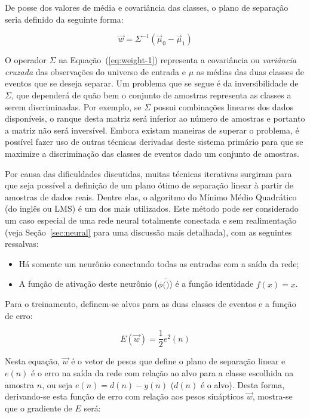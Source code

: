 De posse dos valores de média e covariância das classes, o plano de separação
seria definido da seguinte forma:

\begin{equation}
\overrightarrow{w} = \Sigma^{-1}(\overrightarrow{\mu}_0 -
\overrightarrow{\mu}_1) 
\label{eq:weight-1}
\end{equation}

O operador $\Sigma$ na Equação~(\ref{eq:weight-1}) representa a covariância ou
\textit{variância cruzada} das observações do universo de entrada e $\mu$ as
médias das duas classes de eventos que se deseja separar. Um problema que se
segue é da inversibilidade de $\Sigma$, que dependerá de quão bem o conjunto
de amostras representa as classes a serem discriminadas. Por exemplo, se
$\Sigma$ possui combinações lineares dos dados disponíveis, o ranque desta
matriz será inferior ao número de amostras e portanto a matriz não será
inversível. Embora existam maneiras de superar o problema, é possível fazer
uso de outras técnicas derivadas deste sistema primário para que se maximize a
discriminação das classes de eventos dado um conjunto de amostras.

Por causa das dificuldades discutidas, muitas técnicas iterativas surgiram
para que seja possível a definição de um plano ótimo de separação linear à
partir de amostras de dados reais. Dentre elas, o algoritmo do Mínimo Médio
Quadrático \cite{widrow} (do inglês  ou LMS) é um dos
mais utilizados. Este método pode ser considerado um caso especial de uma rede
neural totalmente conectada e sem realimentação (veja Seção~\ref{sec:neural}
para uma discussão mais detalhada), com as seguintes ressalvas:

\begin{itemize}
\item Há somente um neurônio conectando todas as entradas com a saída da rede;
\item A função de ativação deste neurônio ($\phi(\dot)$) é a função identidade
$f(x) = x$.
\end{itemize}

Para o treinamento, definem-se alvos para as duas classes de eventos e a
função de erro:

\begin{equation}
E(\overrightarrow{w}) = \frac{1}{2} e^2(n)
\label{eq:mse-definition}
\end{equation}

Nesta equação, $\overrightarrow{w}$ é o vetor de pesos que define o plano de
separação linear e $e(n)$ é o erro na saída da rede com relação ao alvo para a
classe escolhida na amostra $n$, ou seja $e(n) = d(n)-y(n)$ ($d(n)$ é o
alvo). Desta forma, derivando-se esta função de erro com relação aos pesos
sinápticos $\overrightarrow{w}$, mostra-se que o gradiente de $E$ será:

